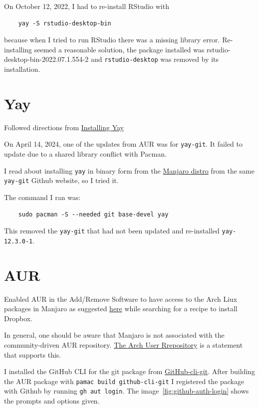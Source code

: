 \documentclass[]{scrartcl}
\begin{document}
On October 12, 2022, I had to re-install RStudio with
\begin{verbatim}
	yay -S rstudio-desktop-bin
\end{verbatim}

because when I tried to run RStudio there was a missing library error. 
Re-installing seemed a reasonable solution, the package installed was rstudio-desktop-bin-2022.07.1.554-2 and \texttt{rstudio-desktop} was removed by its installation.

\section{Yay}
\label{sec:yay}

Followed directions from \href{https://www.tecmint.com/install-yay-aur-helper-in-arch-linux-and-manjaro/}{Installing Yay}


On April 14, 2024, one of the updates from AUR was for \texttt{yay-git}. It failed to update due to a shared library conflict with Pacman. 

I read about installing \texttt{yay} in binary form from the \href{https://github.com/Jguer/yay?tab=readme-ov-file#other-distributions}{Manjaro distro} from the same \texttt{yay-git} Github website, so I tried it.

The command I ran was:

\begin{verbatim}
	sudo pacman -S --needed git base-devel yay
\end{verbatim}

This removed the \texttt{yay-git} that had not been updated and re-installed \texttt{yay-12.3.0-1}.


\section{AUR}

Enabled AUR in the Add/Remove Software to have access to the Arch Liux packages in Manjaro as suggested \href{https://forum.manjaro.org/t/dropbox-install-new-to-manjaro/9576/5}{here} while searching for a recipe to install Dropbox.


In general, one should be aware that Manjaro is not associated with the community-driven AUR repository.
\href{https://wiki.manjaro.org/index.php?title=Arch_User_Repository}{The Arch User Rrepository} is a statement that supports this.

I installed the GitHub CLI for the git package from \href{https://aur.archlinux.org/packages/github-cli-git}{GitHub-cli-git}.
After building the AUR package with \texttt{pamac build github-cli-git} I registered the package with Github by running \texttt{gh aut login}. The image~\ref{fig:github-auth-login} shows the prompts and options given.
\end{document}
